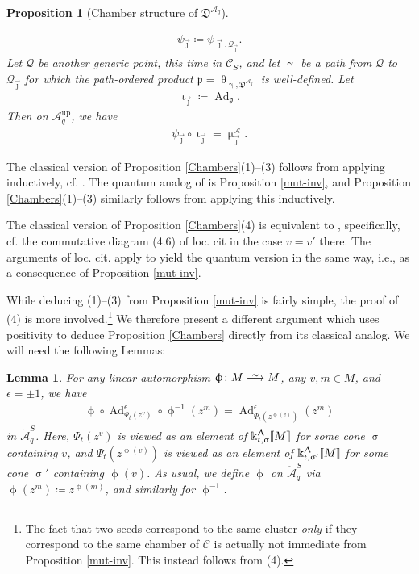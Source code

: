 \documentclass{amsart}
\DeclareMathOperator{\Ad}{Ad}
\DeclareMathOperator{\up}{up}
\let\llb=\llbracket
\let\rrb=\rrbracket
\let\f=\mathfrak
\let\s=\mathcal
\let\mr=\mathring
\def\risom{\buildrel\sim\over{\smashedlongrightarrow}}
\def\smashedlongrightarrow{\setbox0=\hbox{$\longrightarrow$}\ht0=1.25pt\box0}
\newcommand {\kk} {\Bbbk}
\newcommand {\sQ} {\mathcal{Q}}
\newcommand {\jj} {\vec{\jmath}}
\renewcommand{\theta}{\uptheta}
\renewcommand{\iota}{\upiota}
\renewcommand{\gamma}{\upgamma}
\renewcommand{\sigma}{\upsigma}
\renewcommand{\Lambda}{\Uplambda}
\renewcommand{\phi}{\upphi}
\renewcommand{\mu}{\upmu}
\theoremstyle{plain}%
\newtheorem{lem}[thm]{Lemma}
\newtheorem{prop}[thm]{Proposition}
\theoremstyle{definition}
\theoremstyle{remark}
\begin{document}
\begin{prop}[Chamber structure of $\f{D}^{\s{A}_q}$]
\begin{enumerate}
\begin{align}
         \psi_{\jj}\coloneqq \psi_{\jj,\sQ_{\jj}}.
     \end{align}
     Let $\sQ$ be another generic point, this time in $\s{C}_S$, and let $\gamma$ be a path from $\sQ$ to $\sQ_{\jj}$ for which the path-ordered product $\f{p}=\theta_{\gamma,\f{D}^{\s{A}_q}}$ is well-defined.  Let
     \begin{align*}
         \iota_{\jj}\coloneqq \Ad_{\f{p}}.
     \end{align*}
     Then on $\s{A}_q^{\up}$, we have
     \begin{align*}
         \psi_{\jj}\circ \iota_{\jj} = \mu_{\jj}^{\s{A}}.
     \end{align*}
\end{enumerate}
\end{prop}
The classical version of Proposition \ref{Chambers}(1)--(3) follows from applying \cite[Thm. 1.24]{GHKK} inductively, cf. \cite[Construction 1.30]{GHKK}.  The quantum analog of \cite[Thm. 1.24]{GHKK} is Proposition \ref{mut-inv}, and Proposition \ref{Chambers}(1)--(3) similarly follows from applying this inductively.

The classical version of Proposition \ref{Chambers}(4) is equivalent to \cite[Thm. 4.4]{GHKK}, specifically, cf. the commutative diagram (4.6) of loc. cit in the case $v=v'$ there.  The arguments of loc. cit. apply to yield the quantum version in the same way, i.e., as a consequence of Proposition \ref{mut-inv}.

While deducing (1)--(3) from Proposition \ref{mut-inv} is fairly simple, the proof of (4) is more involved.\footnote{The fact that two seeds correspond to the same cluster \textit{only} if they correspond to the same chamber of $\s{C}$ is actually not immediate from Proposition \ref{mut-inv}.  This instead follows from (4).}  We therefore present a different argument which uses positivity to deduce Proposition \ref{Chambers} directly from its classical analog.  We will need the following Lemmas:

\begin{lem}\label{TjAdLem}
For any linear automorphism $\phi\colon M\risom M$, any $v,m\in M$, and $\epsilon=\pm 1$, we have
\begin{align}\label{TjAdEqn}
    \phi\circ \Ad^{\epsilon}_{\Psi_t(z^v)} \circ \phi^{-1}(z^m) = \Ad^{\epsilon}_{\Psi_t(z^{\phi(v)})}(z^m)
\end{align}
in $\mr{\s{A}}_q^S$.  Here, $\Psi_t(z^v)$ is viewed as an element of $\kk_{t,\sigma}^{\Lambda}\llb M\rrb$ for some cone $\sigma$ containing $v$, and $\Psi_t(z^{\phi(v)})$ is viewed as an element of $\kk_{t,\sigma'}^{\Lambda}\llb M\rrb$ for some cone $\sigma'$ containing $\phi(v)$.  As usual, we define $\phi$ on $\mr{\s{A}}_q^S$ via $\phi(z^m)\coloneqq z^{\phi(m)}$, and similarly for $\phi^{-1}$.
\end{lem}
\end{document}
